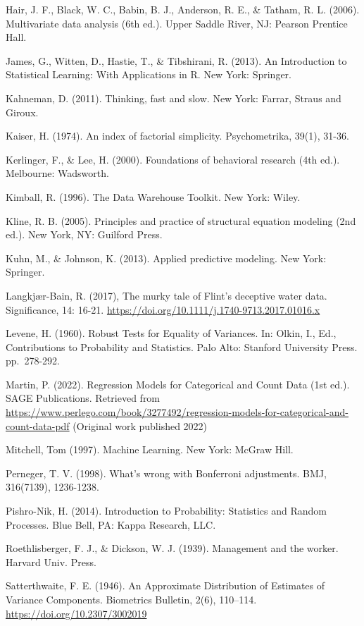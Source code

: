 \documentclass[
]{book}
\begin{document}
Hair, J. F., Black, W. C., Babin, B. J., Anderson, R. E., \& Tatham, R. L. (2006). Multivariate data analysis (6th ed.). Upper Saddle River, NJ: Pearson Prentice Hall.

James, G., Witten, D., Hastie, T., \& Tibshirani, R. (2013). An Introduction to Statistical Learning: With Applications in R. New York: Springer.

Kahneman, D. (2011). Thinking, fast and slow. New York: Farrar, Straus and Giroux.

Kaiser, H. (1974). An index of factorial simplicity. Psychometrika, 39(1), 31-36.

Kerlinger, F., \& Lee, H. (2000). Foundations of behavioral research (4th ed.). Melbourne: Wadsworth.

Kimball, R. (1996). The Data Warehouse Toolkit. New York: Wiley.

Kline, R. B. (2005). Principles and practice of structural equation modeling (2nd ed.). New York, NY: Guilford Press.

Kuhn, M., \& Johnson, K. (2013). Applied predictive modeling. New York: Springer.

Langkjær-Bain, R. (2017), The murky tale of Flint's deceptive water data. Significance, 14: 16-21. \url{https://doi.org/10.1111/j.1740-9713.2017.01016.x}

Levene, H. (1960). Robust Tests for Equality of Variances. In: Olkin, I., Ed., Contributions to Probability and Statistics. Palo Alto: Stanford University Press. pp.~278-292.

Martin, P. (2022). Regression Models for Categorical and Count Data (1st ed.). SAGE Publications. Retrieved from \url{https://www.perlego.com/book/3277492/regression-models-for-categorical-and-count-data-pdf} (Original work published 2022)

Mitchell, Tom (1997). Machine Learning. New York: McGraw Hill.

Perneger, T. V. (1998). What's wrong with Bonferroni adjustments. BMJ, 316(7139), 1236-1238.

Pishro-Nik, H. (2014). Introduction to Probability: Statistics and Random Processes. Blue Bell, PA: Kappa Research, LLC.

Roethlisberger, F. J., \& Dickson, W. J. (1939). Management and the worker. Harvard Univ. Press.

Satterthwaite, F. E. (1946). An Approximate Distribution of Estimates of Variance Components. Biometrics Bulletin, 2(6), 110--114. \url{https://doi.org/10.2307/3002019}
\end{document}
